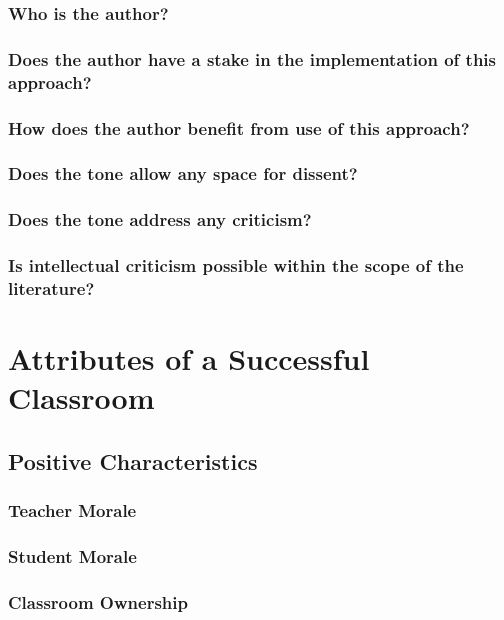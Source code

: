 \documentclass[12pt]{article}
\begin{document}
	\subsubsection{Who is the author?}
	\subsubsection{Does the author have a stake in the implementation of this approach?}
	\subsubsection{How does the author benefit from use of this approach?}
	\subsubsection{Does the tone allow any space for dissent?}
	\subsubsection{Does the tone address any criticism?}
	\subsubsection{Is intellectual criticism possible within the scope of the literature?}
	
	\section{Attributes of a Successful Classroom}
	\subsection{Positive Characteristics}
	\subsubsection{Teacher Morale}
	\subsubsection{Student Morale}
	\subsubsection{Classroom Ownership}
\end{document}
